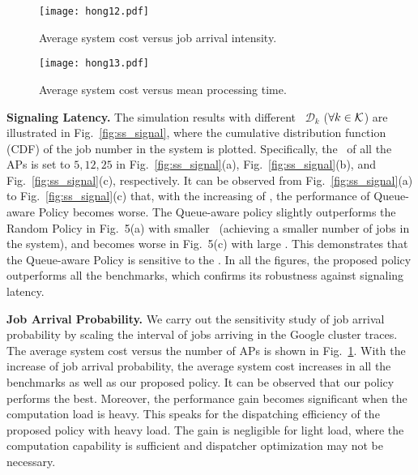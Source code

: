 \begin{figure}[hbt]                                                 %
    \centering                                                      %
    \texttt{[image: hong12.pdf]}   %
    \caption{Average system cost versus job arrival intensity.}
    \label{fig:ss_scale}                                            %
\end{figure}                                                        %

\begin{figure}[hbt]                                                 %
    \centering                                                      %
    \texttt{[image: hong13.pdf]}      %
    \caption{Average system cost versus mean processing time.}
    \label{fig:ss_dist}                                             %
\end{figure}                                                        %

\noindent\textbf{Signaling Latency.}
The simulation results with different \brlatency~$\mathcal{D}_{k}$ ($\forall k\in\mathcal{K}$) are illustrated in Fig.~\ref{fig:ss_signal}, where the cumulative distribution function (CDF) of the job number in the system is plotted.
Specifically, the \brlatency~of all the APs is set to $5, 12, 25$ in Fig.~\ref{fig:ss_signal}(a), Fig.~\ref{fig:ss_signal}(b), and Fig.~\ref{fig:ss_signal}(c), respectively.
It can be observed from Fig.~\ref{fig:ss_signal}(a) to Fig.~\ref{fig:ss_signal}(c) that, with the increasing of \brlatency, the performance of Queue-aware Policy becomes worse.
The Queue-aware policy slightly outperforms the Random Policy in Fig.~5(a) with smaller \brlatency~(achieving a smaller number of jobs in the system), and becomes worse in Fig.~5(c) with large \brlatency.
This demonstrates that the Queue-aware Policy is sensitive to the \brlatency.
In all the figures, the proposed policy outperforms all the benchmarks, which confirms its robustness against signaling latency.

\noindent\textbf{Job Arrival Probability.}
We carry out the sensitivity study of job arrival probability by scaling the interval of jobs arriving in the Google cluster traces.
The average system cost versus the number of APs is shown in Fig.~\ref{fig:ss_scale}.
With the {increase} of job arrival probability, the average system cost increases in all the benchmarks as well as our proposed policy.
It can be observed that our policy performs the best.
Moreover, the performance gain becomes significant when the computation load is heavy.
This speaks for the dispatching efficiency of the proposed policy with heavy load.
The gain is negligible for light load, where the computation capability is sufficient and dispatcher optimization may not be necessary.

